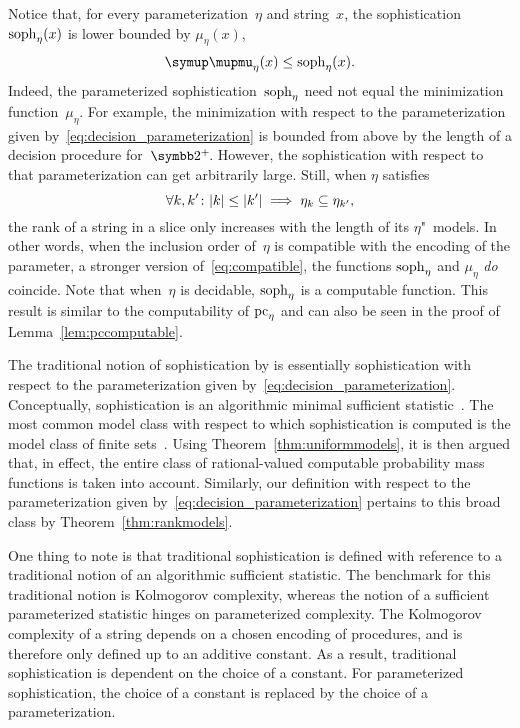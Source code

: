 Notice that, for every parameterization~$\eta$ and string~$x$, the sophistication $\operatorname{soph}_\eta(x)$ is lower bounded by $\mu_\eta(x)$,
\begin{equation*}
  \mu_\eta(x) \le \soph_\eta(x).
\end{equation*}
Indeed, the parameterized sophistication~$\operatorname{soph}_\eta$ need not equal the minimization function~$\mu_\eta$.
For example, the minimization with respect to the parameterization given by~\eqref{eq:decision_parameterization} is bounded from above by the length of a decision procedure for~$\binary^+\!$.
However, the sophistication with respect to that parameterization can get arbitrarily large.
Still, when $\eta$ satisfies
\begin{equation}
\label{eq:compatible_strong}
  \forall k, k'\colon {\lvert k\rvert} \le {\lvert k'\rvert} \implies \eta_k \subseteq \eta_{k'},
\end{equation}
the rank of a string in a slice only increases with the length of its $\eta$"~models.
In other words, when the inclusion order of~$\eta$ is compatible with the encoding of the parameter, a stronger version of~\eqref{eq:compatible}, the functions $\operatorname{soph}_\eta$ and $\mu_\eta$ \emph{do} coincide.
Note that when~$\eta$ is decidable, $\operatorname{soph}_\eta$ is a computable function.
This result is similar to the computability of $\operatorname{pc}_\eta$ and can also be seen in the proof of Lemma~\ref{lem:pccomputable}.

\begin{example}
  The traditional notion of sophistication by \textcite{koppel1988structure} is essentially sophistication with respect to the parameterization given by~\eqref{eq:decision_parameterization}.
  Conceptually, sophistication is an algorithmic minimal sufficient statistic~\parencite{gacs2001algorithmic,vereshchagin2004kolmogorov}.
  The most common model class with respect to which sophistication is computed is the model class of finite sets~\parencite{bloem2015two}.
  Using Theorem~\ref{thm:uniformmodels}, it is then argued that, in effect, the entire class of rational-valued computable probability mass functions is taken into account.
  Similarly, our definition with respect to the parameterization given by~\eqref{eq:decision_parameterization} pertains to this broad class by Theorem~\ref{thm:rankmodels}.

  One thing to note is that traditional sophistication is defined with reference to a traditional notion of an algorithmic sufficient statistic.
  The benchmark for this traditional notion is Kolmogorov complexity, whereas the notion of a sufficient parameterized statistic hinges on parameterized complexity.
  The Kolmogorov complexity of a string depends on a chosen encoding of procedures, and is therefore only defined up to an additive constant.
  As a result, traditional sophistication is dependent on the choice of a constant.
  For parameterized sophistication, the choice of a constant is replaced by the choice of a parameterization.
\end{example}

